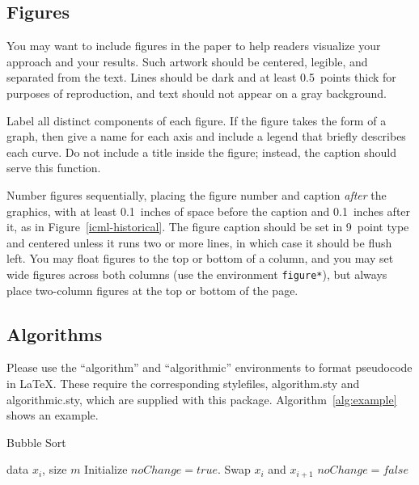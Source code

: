 \documentclass{article}
\begin{document}
\subsection{Figures}

You may want to include figures in the paper to help readers visualize your approach and your results. Such artwork should be centered, legible, and separated from the text. Lines should be dark and at least 0.5~points thick for purposes of reproduction, and text should not appear on a gray background.

Label all distinct components of each figure. If the figure takes the form of a graph, then give a name for each axis and include a legend that briefly describes each curve. Do not include a title inside the figure; instead, the caption should serve this function.

Number figures sequentially, placing the figure number and caption {\it after\/} the graphics, with at least 0.1~inches of space before the caption and 0.1~inches after it, as in
Figure~\ref{icml-historical}.  The figure caption should be set in 9~point type and centered unless it runs two or more lines, in which case it should be flush left.  You may float figures to the top or bottom of a column, and you may set wide figures across both columns (use the environment {\tt figure*}), but always place two-column figures at the top or bottom of the page.

\subsection{Algorithms}

Please use the ``algorithm'' and ``algorithmic''
environments to format pseudocode in \LaTeX\/. These require
the corresponding stylefiles, algorithm.sty and
algorithmic.sty, which are supplied with this package.
Algorithm~\ref{alg:example} shows an example.

\begin{algorithm}[tb]
   \caption{Bubble Sort}
   \label{alg:example}
\begin{algorithmic}
    data $x_i$, size $m$
   \REPEAT
   \STATE Initialize $noChange = true$.
   \STATE Swap $x_i$ and $x_{i+1}$
   \STATE $noChange = false$
   \ENDIF
   \ENDFOR
\end{algorithmic}
\end{algorithm}
\end{document}
